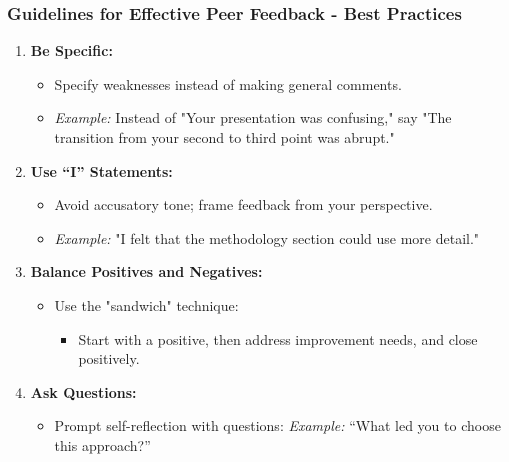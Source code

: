 \documentclass[aspectratio=169]{beamer}
\begin{document}
\begin{frame}[fragile]
    \frametitle{Guidelines for Effective Peer Feedback - Best Practices}
    \begin{enumerate}
        \item \textbf{Be Specific:}
        \begin{itemize}
            \item Specify weaknesses instead of making general comments.
            \item \textit{Example:} Instead of "Your presentation was confusing," say "The transition from your second to third point was abrupt."
        \end{itemize}
        
        \item \textbf{Use ``I'' Statements:}
        \begin{itemize}
            \item Avoid accusatory tone; frame feedback from your perspective.
            \item \textit{Example:} "I felt that the methodology section could use more detail."
        \end{itemize}
        
        \item \textbf{Balance Positives and Negatives:}
        \begin{itemize}
            \item Use the "sandwich" technique: 
            \begin{itemize}
                \item Start with a positive, then address improvement needs, and close positively.
            \end{itemize}
        \end{itemize}
        
        \item \textbf{Ask Questions:}
        \begin{itemize}
            \item Prompt self-reflection with questions: \textit{Example:} ``What led you to choose this approach?''
        \end{itemize}
    \end{enumerate}
\end{frame}
\end{document}
